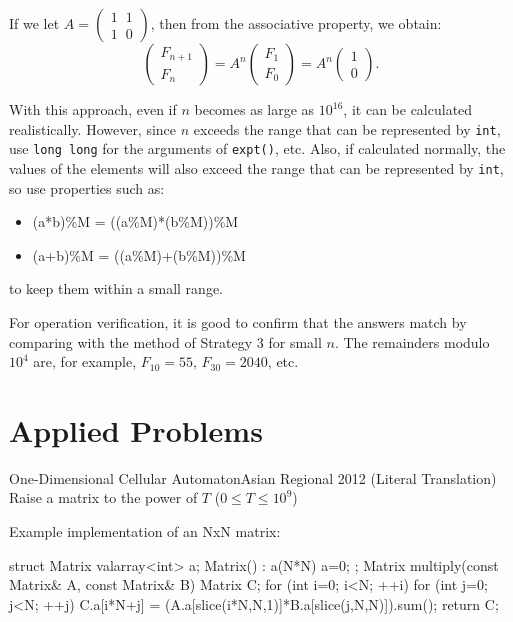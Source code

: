 If we let $A = \left(\begin{array}{cc}
  1 \phantom{x} 1 \\ 1 \phantom{x} 0
\end{array}\right)$, then from the associative property, we obtain:
$$\left(
\begin{array}{cc}
  F_{n+1} \\ F_{n}
\end{array}\right)
 = A^n
\left(\begin{array}{cc}
  F_{1} \\ F_0
\end{array}\right)
 = A^n
\left(\begin{array}{cc}
  1 \\ 0
\end{array}\right).
$$

With this approach, even if $n$ becomes as large as $10^{16}$, it can be calculated realistically. However, since $n$ exceeds the range that can be represented by \texttt{int}, use \texttt{long long} for the arguments of \texttt{expt()}, etc.
Also, if calculated normally, the values of the elements will also exceed the range that can be represented by \texttt{int}, so use properties such as:
\begin{itemize}
\item (a*b)\%M = ((a\%M)*(b\%M))\%M
\item (a+b)\%M = ((a\%M)+(b\%M))\%M
\end{itemize}
to keep them within a small range.

For operation verification, it is good to confirm that the answers match by comparing with the method of Strategy 3 for small $n$.
The remainders modulo $10^4$ are, for example, $F_{10} = 55$, $F_{30} = 2040$, etc.

\section{Applied Problems}

\begin{pbox}{One-Dimensional Cellular Automaton}{Asian Regional 2012}
(Literal Translation) Raise a matrix to the power of $T$  ($0\le T \le 10^9$)

\end{pbox}

Example implementation of an NxN matrix:
\begin{cbox}
struct Matrix {
    valarray<int> a;
    Matrix() : a(N*N) { a=0; }
};
Matrix multiply(const Matrix& A, const Matrix& B) {
    Matrix C;
    for (int i=0; i<N; ++i)
        for (int j=0; j<N; ++j)
            C.a[i*N+j] = (A.a[slice(i*N,N,1)]*B.a[slice(j,N,N)]).sum();
    return C;
}
\end{cbox}



